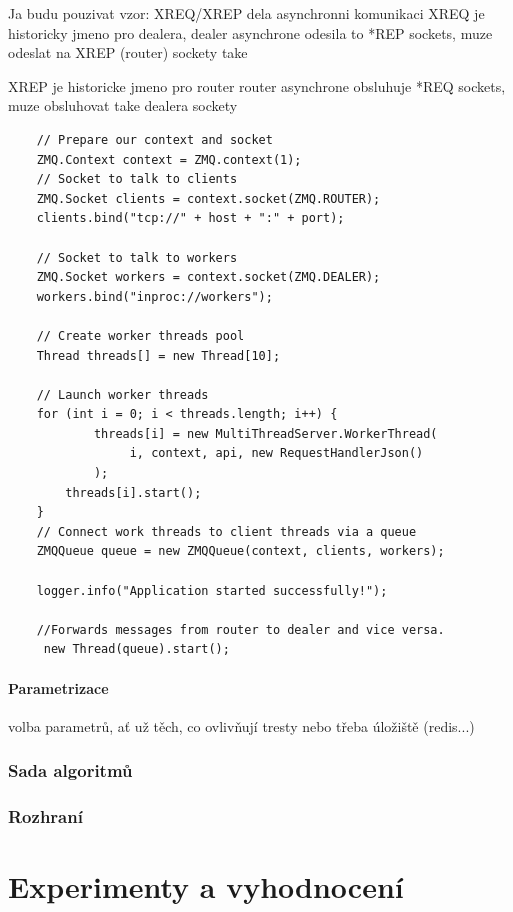 \documentclass[thesis=M,czech]{FITthesis}[2014/05/07]
\begin{document}
Ja budu pouzivat vzor: XREQ/XREP
dela asynchronni komunikaci
XREQ je historicky jmeno pro dealera, dealer asynchrone odesila to *REP  sockets, muze odeslat na XREP (router) sockety take

XREP je historicke jmeno pro router
router asynchrone obsluhuje *REQ sockets, muze obsluhovat take dealera sockety

\begin{verbatim}
    // Prepare our context and socket
    ZMQ.Context context = ZMQ.context(1);
    // Socket to talk to clients
    ZMQ.Socket clients = context.socket(ZMQ.ROUTER);
    clients.bind("tcp://" + host + ":" + port);

    // Socket to talk to workers
    ZMQ.Socket workers = context.socket(ZMQ.DEALER);
    workers.bind("inproc://workers");

    // Create worker threads pool
    Thread threads[] = new Thread[10];

    // Launch worker threads
    for (int i = 0; i < threads.length; i++) {
    		threads[i] = new MultiThreadServer.WorkerThread(
    		     i, context, api, new RequestHandlerJson()
    		);
        threads[i].start();
    }
    // Connect work threads to client threads via a queue
    ZMQQueue queue = new ZMQQueue(context, clients, workers);

    logger.info("Application started successfully!");

    //Forwards messages from router to dealer and vice versa.
     new Thread(queue).start();
\end{verbatim}

\subsubsection{Parametrizace}
volba parametrů, ať už těch, co ovlivňují tresty nebo třeba úložiště (redis...)

\subsection{Sada algoritmů}
\label{sec:alg}

\subsection{Rozhraní}

\chapter{Experimenty a vyhodnocení}
\label{chap:tests}
\end{document}
